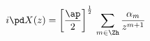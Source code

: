 \begin{equation}
i\pd X(z)=\left[\frac{\ap}{2}\right]^{\frac12}\,
\sum_{m\in\Zh}\frac{\alpha_m}{z^{m+1}}
\end{equation}

